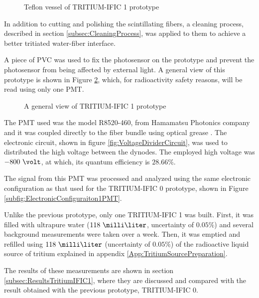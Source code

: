 \begin{figure}[h]
 \centering
 \caption{Teflon vessel of TRITIUM-IFIC 1 prototype}
 \label{fig:TeflonVesselTritumIFIC1}
\end{figure}

In addition to cutting and polishing the scintillating fibers, a cleaning process, described in section \ref{subsec:CleaningProcess}, was applied to them to achieve a better tritiated water-fiber interface.

A piece of PVC was used to fix the photosensor on the prototype and prevent the photosensor from being affected by external light. A general view of this prototype is shown in Figure \ref{fig:TritumIFIC1}, which, for radioactivity safety reasons, will be read using only one PMT.

\begin{figure}[h]
 \centering
 \caption{A general view of TRITIUM-IFIC 1 prototype}
 \label{fig:TritumIFIC1}
\end{figure}

The PMT used was the model R8520-460, from Hamamatsu Photonics company \cite{DataSheetPMTs} and it was coupled directly to the fiber bundle using optical grease \cite{OpticalGrease}. The electronic circuit, shown in figure \ref{fig:VoltageDividerCircuit}, was used to distributed the high voltage between the dynodes. The employed high voltage was $-800~\volt$, at which, its quantum efficiency is $28.66\%$.

The signal from this PMT was processed and analyzed using the same electronic configuration as that used for the TRITIUM-IFIC 0 prototype, shown in Figure \ref{subfig:ElectronicConfiguraiton1PMT}.

Unlike the previous prototype, only one TRITIUM-IFIC 1 was built. First, it was filled with ultrapure water ($118~\milli\liter$, uncertainty of $0.05\%$) and several background measurements were taken over a week. Then, it was emptied and refilled using $118~\milli\liter$ (uncertainty of $0.05\%$) of the radioactive liquid source of tritium explained in appendix \ref{App:TritiumSourcePreparation}.

The results of these measurements are shown in section \ref{subsec:ResultsTritiumIFIC1}, where they are discussed and compared with the result obtained with the previous prototype, TRITIUM-IFIC 0.